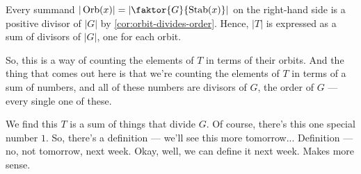 \begin{content}
\begin{center}
\end{center}

\begin{steps}
Every summand $|\operatorname{Orb}(x)| = \left| \faktor{G}{\operatorname{Stab}(x)} \right|$ on the right-hand side is a positive divisor of $|G|$ by \cref{cor:orbit-divides-order}. Hence, $|T|$ is expressed as a sum of divisors of $|G|$, one for each orbit.
\end{steps}
\end{content}

\begin{hidden}
\end{hidden}

\begin{speech}[00:41:39 - 00:42:14]
So, this is a way of counting the elements of $T$ in terms of their orbits. And the thing that comes out here is that we're counting the elements of $T$ in terms of a sum of numbers, and all of these numbers are divisors of $G$, the order of $G$ --- every single one of these.

We find this $T$ is a sum of things that divide $G$. Of course, there's this one special number $1$. So, there's a definition --- we'll see this more tomorrow... Definition  --- no, not tomorrow, next week. Okay, well, we can define it next week. Makes more sense.
\end{speech}


